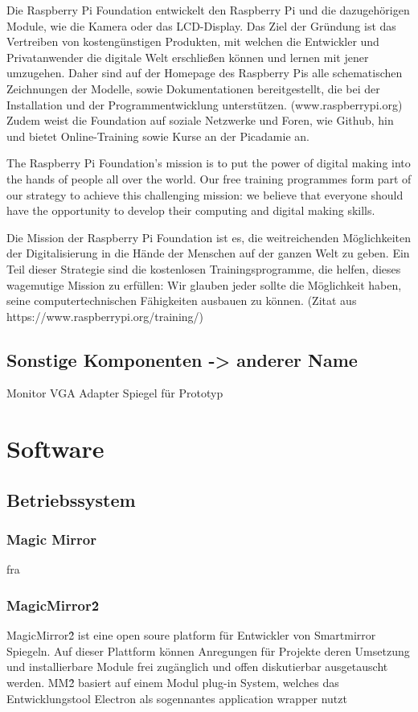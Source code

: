 \documentclass[12pt,a4paper]{report}
\begin{document}
Die Raspberry Pi Foundation entwickelt den Raspberry Pi und die dazugehörigen Module, wie die Kamera oder das LCD-Display. Das Ziel der Gründung ist das Vertreiben von kostengünstigen Produkten, mit welchen die Entwickler und Privatanwender die digitale Welt erschließen können und lernen mit jener umzugehen. Daher sind auf der Homepage des Raspberry Pis alle schematischen Zeichnungen der Modelle, sowie Dokumentationen bereitgestellt, die bei der Installation und der Programmentwicklung unterstützen. (www.raspberrypi.org)
Zudem weist die Foundation auf soziale Netzwerke und Foren, wie Github, hin und bietet Online-Training sowie Kurse an der Picadamie an.

The Raspberry Pi Foundation’s mission is to put the power of digital making into the hands of people all over the world. Our free training programmes form part of our strategy to achieve this challenging mission: we believe that everyone should have the opportunity to develop their computing and digital making skills.

Die Mission der Raspberry Pi Foundation ist es, die weitreichenden Möglichkeiten der Digitalisierung in die Hände der Menschen auf der ganzen Welt zu geben. Ein Teil dieser Strategie sind die kostenlosen Trainingsprogramme, die helfen, dieses wagemutige Mission zu erfüllen: Wir glauben jeder sollte die Möglichkeit haben, seine computertechnischen Fähigkeiten ausbauen zu können. (Zitat aus https://www.raspberrypi.org/training/)

\section{Sonstige Komponenten -> anderer Name}
Monitor VGA Adapter Spiegel für Prototyp
\chapter{Software}
\section{Betriebssystem}
\subsection*{Magic Mirror}
fra
\subsection*{MagicMirror\^2}
MagicMirror\^2 ist eine open soure platform für Entwickler von Smartmirror Spiegeln. Auf dieser Plattform können Anregungen für Projekte deren Umsetzung und installierbare Module frei zugänglich und offen diskutierbar ausgetauscht werden. MM\^2 basiert auf einem Modul plug-in System, welches das Entwicklungstool Electron als sogennantes application wrapper nutzt 
\end{document}
